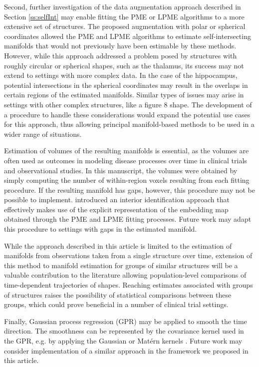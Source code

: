\documentclass[12pt]{article}
\theoremstyle{definition}
\begin{document}
Second, further investigation of the  data augmentation approach described in Section \ref{ss:selfInt} may enable fitting the PME or LPME algorithms to a more extensive set of structures. The proposed augmentation with polar or spherical coordinates allowed the PME and LPME algorithms to estimate self-intersecting manifolds that would not previously have been estimable by these methods. However, while this approach addressed a problem posed by structures with roughly circular or spherical shapes, such as the thalamus, its success may not extend to settings with more complex data. In the case of the hippocampus, potential intersections in the spherical coordinates may result in the overlaps in certain regions of the estimated manifolds. Similar types of issues may arise in settings with other complex structures, like a figure 8 shape. The development of a procedure to handle these considerations would expand the potential use cases for this approach, thus allowing principal manifold-based methods to be used in a wider range of situations.

Estimation of volumes of the resulting manifolds is essential, as the volumes are often used as outcomes in modeling disease processes over time in clinical trials and observational studies. In this manuscript, the volumes were obtained by simply computing the number of within-region voxels resulting from each fitting procedure. If the resulting manifold has gaps, however, this procedure may not be possible to implement. \cite{mengPrincipalManifoldEstimation2021} introduced an interior identification approach that effectively makes use of the explicit representation of the embedding map obtained through the PME and LPME fitting processes. Future work may adapt this procedure to settings with gaps in the estimated manifold.

While the approach described in this article is limited to the estimation of manifolds from observations taken from a single structure over time, extension of this method to manifold estimation for groups of similar structures will be a valuable contribution to the literature allowing population-level comparisons of time-dependent trajectories of shapes. Reaching estimates associated with groups of structures raises the possibility of statistical comparisons between these groups, which could prove beneficial in a number of clinical trial settings.

Finally, Gaussian process regression (GPR) may be applied to smooth the time direction. The smoothness can be represented by the covariance kernel used in the GPR, e.g. by applying the Gaussian or Matérn kernels \citep{li2023inference}. Future work may consider implementation of a similar approach in the framework we proposed in this article. 
\end{document}
